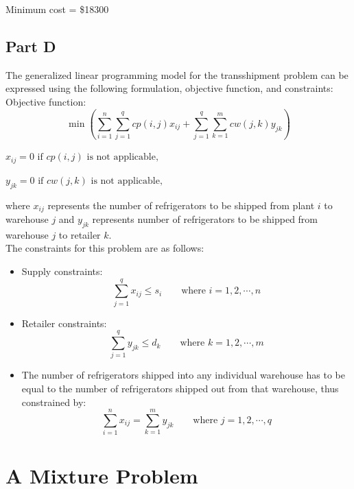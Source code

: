 \documentclass[11pt]{scrreprt}
\begin{document}
Minimum cost = \$18300

\section{Part D}
The generalized linear programming model for the transshipment problem 
can be expressed using the following formulation, objective function,
and constraints:\\

Objective function:
\begin{displaymath}
\min \left(\sum_{i=1}^{n} \sum_{j=1}^{q} cp(i,j)x_{ij} + \sum_{j=1}^{q} \sum_{k=1}^{m} cw(j,k)y_{jk}\right)
\end{displaymath}

$x_{ij}=0 \textrm{ if } cp(i,j) \textrm{ is not applicable, }$

$y_{jk}=0 \textrm{ if } cw(j,k) \textrm{ is not applicable,}$

where $x_{ij}$ represents the number of refrigerators to be shipped 
from plant $i$ to warehouse $j$ and $y_{jk}$ represents number of 
refrigerators to be shipped from warehouse $j$ to retailer $k$.\\

The constraints for this problem are as follows:

\begin{itemize}
	\item Supply constraints:
	\begin{displaymath}
	\sum_{j=1}^{q} x_{ij} \leq s_i 
	\qquad\textrm{where } i=1,2,\cdots,n
	\end{displaymath}
	\item Retailer constraints:
	\begin{displaymath}
	\sum_{j=1}^{q} y_{jk} \leq d_k 
	\qquad\textrm{where } k=1,2,\cdots,m
	\end{displaymath}
	\item The number of refrigerators shipped into any individual 
	warehouse has to be equal to the number of refrigerators 
	shipped out from that warehouse, thus constrained by:
	\begin{displaymath}
	\sum_{i=1}^{n} x_{ij} = \sum_{k=1}^{m} y_{jk} 
	\qquad\textrm{where } j=1,2,\cdots,q
	\end{displaymath}
\end{itemize}




\chapter{A Mixture Problem}
\end{document}
